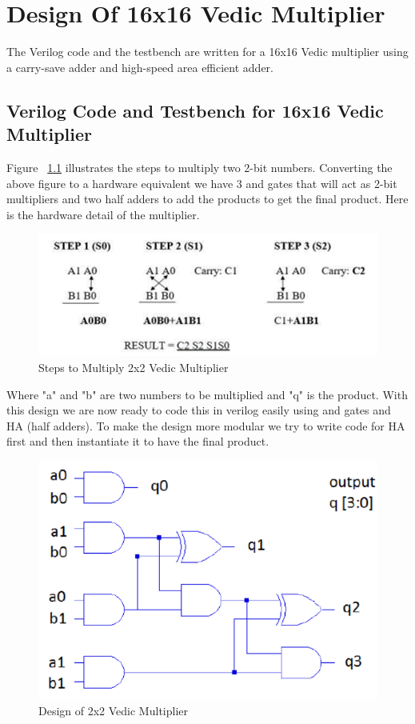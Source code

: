 \chapter{Design Of 16x16 Vedic Multiplier}

\indent\indent The Verilog code and the testbench are written for a 16x16 Vedic multiplier using a carry-save adder and high-speed area efficient adder.


\section{Verilog Code and Testbench for 16x16 Vedic Multiplier}
Figure ~\ref{fig:x1} illustrates the steps to multiply two 2-bit numbers. Converting the above figure to a hardware equivalent we have 3 and gates that will act as 2-bit multipliers and two half adders to add the products to get the final product. Here is the hardware detail of the multiplier.
\begin{figure}[htb]
	\centering
	\includegraphics[width=0.80\columnwidth]{Figures/x1}	
	\caption{Steps to Multiply 2x2 Vedic Multiplier}
	\label{fig:x1}
\end{figure}
Where "a" and "b" are two numbers to be multiplied and "q" is the product. With this design we are now ready to code this in verilog easily using and gates and HA (half adders). To make the design more modular we try to write code for HA first and then instantiate it to have the final product. \\
\begin{figure}[htb]
	\centering
	\includegraphics[width=0.5\columnwidth]{Figures/x6}	
	\caption{Design of 2x2 Vedic Multiplier}
	\label{fig:x6}
\end{figure}
